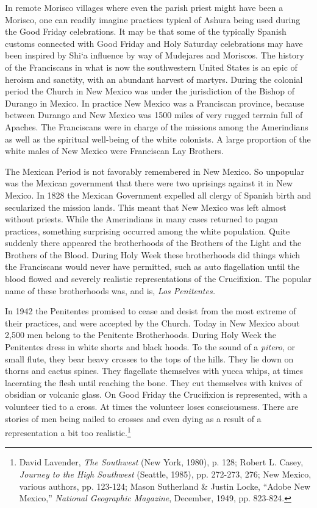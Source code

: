 In remote Morisco villages where even the parish priest might have been a Morisco, one can readily imagine practices typical of Ashura being used during the Good Friday celebrations. It may be that some of the typically Spanish customs connected with Good Friday and Holy Saturday celebrations may have been inspired by Shi`a influence by way of Mudejares and Moriscos. The history of the Franciscans in what is now the southwestern United States is an epic of heroism and sanctity, with an abundant harvest of martyrs. During the colonial period the Church in New Mexico was under the jurisdiction of the Bishop of Durango in Mexico. In practice New Mexico was a Franciscan province, because between Durango and New Mexico was 1500 miles of very rugged terrain full of Apaches. The Franciscans were in charge of the missions among the Amerindians as well as the spiritual well-being of the white colonists. A large proportion of the white males of New Mexico were Franciscan Lay Brothers.

The Mexican Period is not favorably remembered in New Mexico. So unpopular was the Mexican government that there were two uprisings against it in New Mexico. In 1828 the Mexican Government expelled all clergy of Spanish birth and secularized the mission lands. This meant that New Mexico was left almost without priests. While the Amerindians in many cases returned to pagan practices, something surprising occurred among the white population. Quite suddenly there appeared the brotherhoods of the Brothers of the Light and the Brothers of the Blood. During Holy Week these brotherhoods did things which the Franciscans would never have permitted, such as auto flagellation until the blood flowed and severely realistic representations of the Crucifixion. The popular name of these brotherhoods was, and is, \emph{Los Penitentes.}

In 1942 the Penitentes promised to cease and desist from the most extreme of their practices, and were accepted by the Church. Today in New Mexico about 2,500 men belong to the Penitente Brotherhoods. During Holy Week the Penitentes dress in white shorts and black hoods. To the sound of a \emph{pitero}, or small flute, they bear heavy crosses to the tops of the hills. They lie down on thorns and cactus spines. They flagellate themselves with yucca whips, at times lacerating the flesh until reaching the bone. They cut themselves with knives of obsidian or volcanic glass. On Good Friday the Crucifixion is represented, with a volunteer tied to a cross. At times the volunteer loses consciousness. There are stories of men being nailed to crosses and even dying as a result of a representation a bit too realistic.\footnote{David Lavender, \emph{The Southwest} (New York, 1980), p. 128; Robert L. Casey, \emph{Journey to the High Southwest} (Seattle, 1985), pp. 272-273, 276; New Mexico, various authors, pp. 123-124; Mason Sutherland \& Justin Locke, ``Adobe New Mexico,'' \emph{National Geographic Magazine}, December, 1949, pp. 823-824.}

